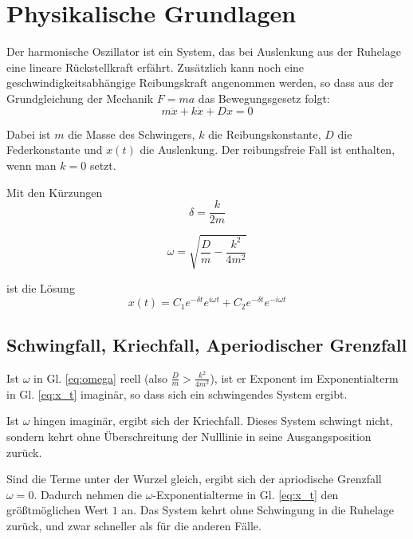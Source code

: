 \documentclass[a4paper,german,12pt,smallheadings]{scrartcl}
\begin{document}
\begin{titlepage}

\end{titlepage}

\allowdisplaybreaks %

\section{Physikalische Grundlagen}
Der harmonische Oszillator ist ein System, das bei Auslenkung aus der Ruhelage
eine lineare Rückstellkraft erfährt. Zusätzlich kann noch eine
geschwindigkeitsabhängige Reibungskraft angenommen werden, so dass aus der
Grundgleichung der Mechanik $F=ma$ das Bewegungsgesetz folgt:
\begin{equation}
  m \ddot{x} + k \dot{x} + D x = 0
\end{equation}

Dabei ist $m$ die Masse des Schwingers, $k$ die Reibungskonstante, $D$ die
Federkonstante und $x(t)$ die Auslenkung. Der reibungsfreie Fall ist enthalten,
wenn man $k=0$ setzt.

Mit den Kürzungen
\begin{equation}
  \delta = \frac{k}{2m}
  \label{eq:delta}
\end{equation}

\begin{equation}
  \omega = \sqrt{\frac{D}{m} - \frac{k^2}{4m^2}}
  \label{eq:omega}
\end{equation}

ist die Lösung
\begin{equation}
  x(t) = C_1 e^{- \delta t} e^{i \omega t} + C_2 e^{-\delta t} e^{-i \omega t}
  \label{eq:x_t}
\end{equation}

\subsection{Schwingfall, Kriechfall, Aperiodischer Grenzfall}
Ist $\omega$ in Gl. \ref{eq:omega} reell (also $\frac{D}{m} >
\frac{k^2}{4m^2}$), ist er Exponent im Exponentialterm in Gl. \ref{eq:x_t}
imaginär, so dass sich ein schwingendes System ergibt.

Ist $\omega$ hingen imaginär, ergibt sich der Kriechfall. Dieses System
schwingt nicht, sondern kehrt ohne Überschreitung der Nulllinie in seine
Ausgangsposition zurück.

Sind die Terme unter der Wurzel gleich, ergibt sich der apriodische Grenzfall
$\omega = 0$. Dadurch nehmen die $\omega$-Exponentialterme in Gl. \ref{eq:x_t}
den größtmöglichen Wert $1$ an. Das System kehrt ohne Schwingung in die
Ruhelage zurück, und zwar schneller als für die anderen Fälle.
\end{document}
